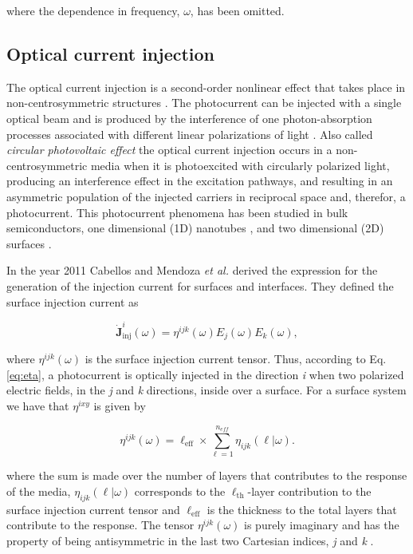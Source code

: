 \documentclass[twocolumn,aps,pra,11pt,tightenlines,showpacs,superscriptaddress,groupedaddress]{revtex4-1}
\newcommand{\ea}{$\eta^{ixy}$}
\begin{document}
\noindent where the dependence in frequency, $\omega$, has been omitted.

    \subsection{Optical current injection}

The optical current injection is a second-order nonlinear effect that takes place in non-centrosymmetric structures \cite{nastos2006optical,cabellos2011optical,bhat2005excitonic,fraser1999quantum}. The photocurrent can be injected with a single optical beam and is produced by the interference of one photon-absorption processes associated with different linear polarizations of light \cite{sipe2000second}. Also called  \emph{circular photovoltaic effect} the optical current injection occurs in a non-centrosymmetric media when it is photoexcited with circularly polarized light, producing an interference effect in the excitation pathways, and resulting in an asymmetric population of the injected carriers in reciprocal space and, therefor, a photocurrent. This photocurrent phenomena has been studied in bulk semiconductors, one dimensional (1D) nanotubes \cite{mele2000coherent,kral2000photogalvanic}, and two dimensional (2D) surfaces \cite{mele2000coherent}.

In the year 2011 Cabellos and Mendoza \emph{et al.} \cite{cabellos2011optical}  derived the expression for the generation of the injection current for surfaces and interfaces. They defined the surface injection current as 

\begin{equation}
    \mathbf{\dot{J}}^{i}_{\text{inj}}(\omega) = \eta^{ijk}(\omega)E_{j}(\omega)E_{k}(\omega), \label{eq:eta}   
\end{equation}

\noindent where $\eta^{ijk}(\omega)$ is the surface injection current tensor. Thus, according to Eq. \ref{eq:eta}, a photocurrent is optically injected in the direction \emph{i} when two polarized electric fields, in the \emph{j} and \emph{k} directions, inside over a surface. For a surface system we have that {\ea} is given by \cite{cabellos2011optical, arzate2014optical} 

\begin{equation}
    \eta^{ijk} (\omega) = \ell_{\text{eff}} \times \sum_{\ell=1}^{n_{eff}} \eta_{ijk} (\ell|\omega). \label{eq:etaeff}
\end{equation}

\noindent where the sum is made over the number of layers that contributes to the response of the media, $\eta_{ijk} (\ell|\omega)$ corresponds to the $\ell_{\text{th}}$-layer contribution to the surface injection current tensor and $\ell_{\text{eff}}$ is the thickness to the total layers that contribute to the response. The tensor $\eta^{ijk}(\omega)$ is purely imaginary and has the property of being antisymmetric in the last two Cartesian indices, \emph{j} and \emph{k} \cite{sipe2000second,nastos2006optical}. 
\end{document}
